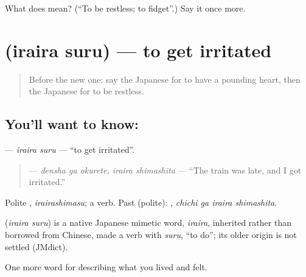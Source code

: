 \begin{tcolorbox}[breakable,colback=teal!4,colframe=teal!35!black,title={Before you move on}]
What does  mean? (\textquotedblleft{}To be restless; to fidget\textquotedblright{}.) Say it once more.
\end{tcolorbox}
\section[\texorpdfstring{\ja{いらいらする} (iraira suru)}{いらいらする (iraira suru)}]{ (iraira suru) — to get irritated}

\label{lesson:JA-C427-iraira-suru}



\begin{quote}
Before the new one: say the Japanese for to have a pounding heart, then the Japanese for to be restless.
\end{quote}

\subsection*{You'll want to know: }
\textbf{} — \emph{iraira suru} — \textquotedblleft{}to get irritated\textquotedblright{}.

\begin{quote}
\textbf{ } — \emph{densha ga okurete, iraira shimashita} — \textquotedblleft{}The train was late, and I got irritated.\textquotedblright{}
\end{quote}

Polite \textbf{}, \emph{irairashimasu}; a  verb. Past (polite): \textbf{ }, \emph{chichi ga iraira shimashita}.

\begin{cousinweb}
\textbf{} (\emph{iraira suru}) is a native Japanese mimetic word, \emph{iraira}, inherited rather than borrowed from Chinese, made a verb with \emph{suru}, \textquotedblleft{}to do\textquotedblright{}; its older origin is not settled (JMdict).
\end{cousinweb}

\begin{grammarlens}[title={What you've built}]
One more word for describing what you lived and felt.
\end{grammarlens}

